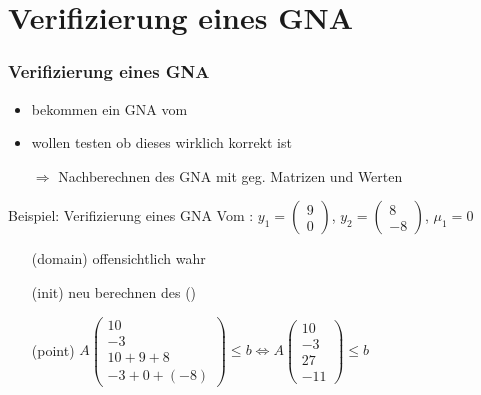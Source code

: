\section{Verifizierung eines GNA}
\frame{\tableofcontents[currentsection]}
\begin{frame}
	\frametitle{\color{white}Verifizierung eines GNA}
	\begin{itemize}
		\item bekommen ein GNA vom \solver
		\item wollen testen ob dieses wirklich korrekt ist
		\item[$\Rightarrow$] Nachberechnen des GNA mit geg. Matrizen und Werten
	\end{itemize}
	\begin{exampleblock}{Beispiel: Verifizierung eines GNA }
		Vom \solver: $y_1=\begin{pmatrix} 9 \\ 0 \end{pmatrix}$, $y_2=\begin{pmatrix} 8 \\ -8 \end{pmatrix}$, $\mu_1=0$\newline
		\vspace*{-.8em}
		\begin{itemize}
			\setlength{\itemindent}{1.5cm}
			\item[(domain)] offensichtlich wahr \checkmark
			\item[(init)] neu berechnen des \stem (\checkmark)
			\item[(point)]  $A\begin{pmatrix} 10 \\ -3 \\ 10+9+8 \\ -3 + 0 + (-8) \end{pmatrix} \le b \Leftrightarrow A\begin{pmatrix} 10 \\ -3 \\ 27 \\ -11 \end{pmatrix} \le b$ \checkmark
		\end{itemize}
	\end{exampleblock}
\end{frame}

